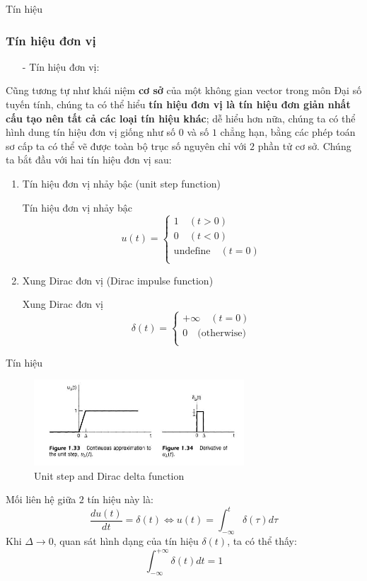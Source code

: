 \documentclass[8pt]{beamer}
\begin{document}
	\begin{frame}{Tín hiệu}
\subsubsection{Tín hiệu đơn vị}
\begin{itemize}
	\item[-] Tín hiệu đơn vị:
\end{itemize}
Cũng tương tự như khái niệm \textbf{cơ sở} của một không gian vector trong môn Đại số tuyến tính, chúng ta có thể hiểu \textbf{tín hiệu đơn vị là tín hiệu đơn giản nhất cấu tạo nên tất cả các loại tín hiệu khác}; dễ hiểu hơn nữa, chúng ta có thể hình dung tín hiệu đơn vị giống như số $0$ và số $1$ chẳng hạn, bằng các phép toán sơ cấp ta có thể vẽ được toàn bộ trục số nguyên chỉ với $2$ phần tử cơ sở. Chúng ta bắt đầu với hai tín hiệu đơn vị sau:
\begin{enumerate}
	\item Tín hiệu đơn vị nhảy bậc (unit step function)
		\begin{block}{Tín hiệu đơn vị nhảy bậc}
			\begin{equation*}
				u(t)=
			\begin{cases}
			1 \quad(t>0) \\
			0 \quad (t<0) \\
			\text{undefine} \quad (t=0)\\
		\end{cases}
	\end{equation*}
\end{block}
\item Xung Dirac đơn vị (Dirac impulse function)
	\begin{block}{Xung Dirac đơn vị}
		\begin{equation*}
			\delta(t)=
			\begin{cases}
				+\infty\quad (t=0)\\
				0 \quad \text{(otherwise)}\\
			\end{cases}
		\end{equation*}

		\end{block}
\end{enumerate}
\end{frame}
\begin{frame}{Tín hiệu}
\begin{figure}[h]
			\includegraphics[width=0.7\textwidth]{unit.jpg}
			\caption{Unit step and Dirac delta function}			\label{fig:re10}
		\end{figure}


Mối liên hệ giữa $2$ tín hiệu này là:
$$\frac{du(t)}{dt}=\delta(t)\Leftrightarrow u(t)=\int_{-\infty}^{t}\delta(\tau)d\tau$$
Khi $\Delta\to 0$, quan sát hình dạng của tín hiệu $\delta(t)$, ta có thể thấy:
$$\int_{-\infty}^{+\infty}\delta(t)dt=1$$
\end{frame}
\end{document}
